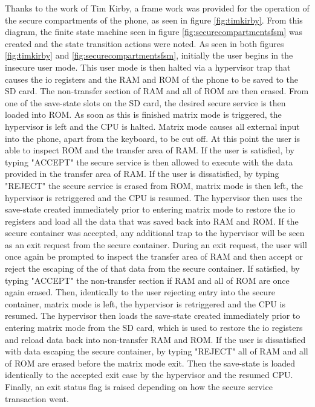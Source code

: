 Thanks to the work of Tim Kirby, a frame work was provided for the operation of the secure compartments of the phone, as seen in figure \ref{fig:timkirby}. From this diagram, the finite state machine seen in figure \ref{fig:securecompartmentsfsm} was created and the state transition actions were noted. As seen in both figures \ref{fig:timkirby} and \ref{fig:securecompartmentsfsm}, initially the user begins in the insecure user mode. This user mode is then halted via a hypervisor trap that causes the io registers and the RAM and ROM of the phone to be saved to the SD card. The non-transfer section of RAM and all of ROM are then erased. From one of the save-state slots on the SD card, the desired secure service is then loaded into ROM. As soon as this is finished matrix mode is triggered, the hypervisor is left and the CPU is halted. Matrix mode causes all external input into the phone, apart from the keyboard, to be cut off. At this point the user is able to inspect ROM and the transfer area of RAM. If the user is satisfied, by typing "ACCEPT" the secure service is then allowed to execute with the data provided in the transfer area of RAM. If the user is dissatisfied, by typing "REJECT" the secure service is erased from ROM, matrix mode is then left, the hypervisor is retriggered and the CPU is resumed. The hypervisor then uses the save-state created immediately prior to entering matrix mode to restore the io registers and load all the data that was saved back into RAM and ROM. If the secure container was accepted, any additional trap to the hypervisor will be seen as an exit request from the secure container. During an exit request, the user will once again be prompted to inspect the transfer area of RAM and then accept or reject the escaping of the of that data from the secure container. If satisfied, by typing "ACCEPT" the non-transfer section if RAM and all of ROM are once again erased. Then, identically to the user rejecting entry into the secure container, matrix mode is left, the hypervisor is retriggered and the CPU is resumed. The hypervisor then loads the save-state created immediately prior to entering matrix mode from the SD card, which is used to restore the io registers and reload data back into non-transfer RAM and ROM. If the user is dissatisfied with data escaping the secure container, by typing "REJECT" all of RAM and all of ROM are erased before the matrix mode exit. Then the save-state is loaded identically to the accepted exit case by the hypervisor and the resumed CPU. Finally, an exit status flag is raised depending on how the secure service transaction went.

